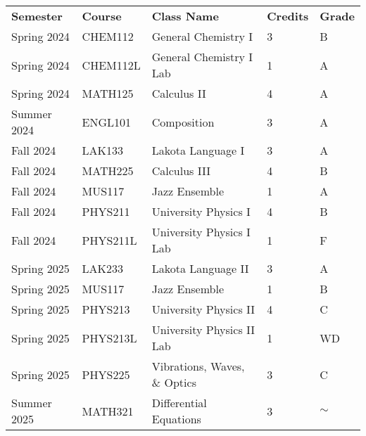 \documentclass[12pt]{article}
\begin{document}
\begin{table}[]
\begin{tabular}{lllll}
\textbf{Semester} & \textbf{Course} & \textbf{Class Name}                       & \textbf{Credits} & \textbf{Grade} \\
Spring 2024       & CHEM112         & General Chemistry I                       & 3                & B              \\
Spring 2024       & CHEM112L        & General Chemistry I Lab                   & 1                & A              \\
Spring 2024       & MATH125         & Calculus II                               & 4                & A              \\
Summer 2024       & ENGL101         & Composition                               & 3                & A              \\
Fall 2024         & LAK133          & Lakota Language I                         & 3                & A              \\
Fall 2024         & MATH225         & Calculus III                              & 4                & B              \\
Fall 2024         & MUS117          & Jazz Ensemble                             & 1                & A              \\
Fall 2024         & PHYS211         & University Physics I                      & 4                & B              \\
Fall 2024         & PHYS211L        & University Physics I Lab                  & 1                & F              \\
Spring 2025       & LAK233          & Lakota Language II                        & 3                & A              \\
Spring 2025       & MUS117          & Jazz Ensemble                             & 1                & B              \\
Spring 2025       & PHYS213         & University Physics II                     & 4                & C              \\
Spring 2025       & PHYS213L        & University Physics II Lab                 & 1                & WD             \\
Spring 2025       & PHYS225         & Vibrations, Waves, \& Optics              & 3                & C              \\
Summer 2025       & MATH321         & Differential Equations                    & 3                & $\sim$         \\

\end{tabular}
\end{table}
\end{document}
